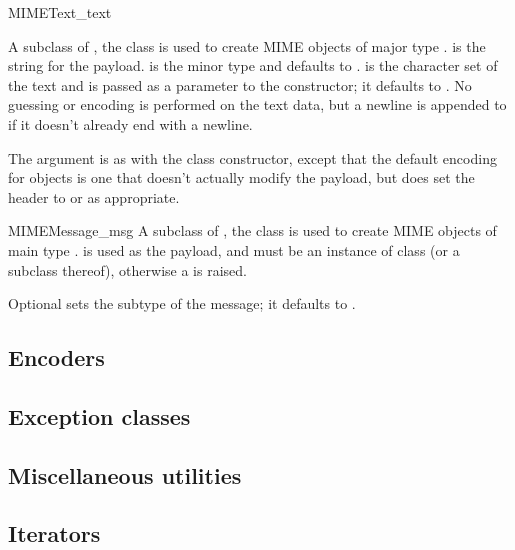 \begin{classdesc}{MIMEText}{_text}

A subclass of , the  class is used to
create MIME objects of major type .   is the
string for the payload.   is the minor type and defaults
to .   is the character set of the text and is
passed as a parameter to the  constructor; it defaults
to .  No guessing or encoding is performed on the text
data, but a newline is appended to  if it doesn't already
end with a newline.

The  argument is as with the  class
constructor, except that the default encoding for 
objects is one that doesn't actually modify the payload, but does set
the  header to  or
 as appropriate.
\end{classdesc}

\begin{classdesc}{MIMEMessage}{_msg}
A subclass of , the  class is used to
create MIME objects of main type .   is used as
the payload, and must be an instance of class  (or a
subclass thereof), otherwise a  is raised.

Optional  sets the subtype of the message; it defaults
to .
\end{classdesc}

\subsection{Encoders}


\subsection{Exception classes}


\subsection{Miscellaneous utilities}


\subsection{Iterators}


